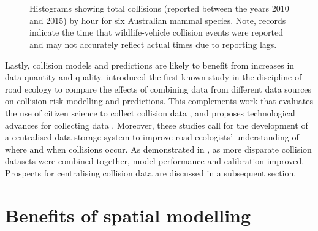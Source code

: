 \begin{figure*}[!t]
  \centering
	\begin{minipage}[t]{.9\textwidth}
    	\centering
    	\hspace{.5cm}
    	\\ 
    	\hspace{.5cm}
    	\\
    	\hspace{.5cm}
    \end{minipage}
  \caption[Total collisions by hour for six mammal species]{Histograms showing total collisions (reported between the years 2010 and 2015) by hour for six Australian mammal species. Note, records indicate the time that wildlife-vehicle collision events were reported and may not accurately reflect actual times due to reporting lags.}
  \label{temporal_all}
\end{figure*}

Lastly, collision models and predictions are likely to benefit from increases in data quantity and quality.  introduced the first known study in the discipline of road ecology to compare the effects of combining data from different data sources on collision risk modelling and predictions. This complements work that evaluates the use of citizen science to collect collision data \citep{paul14, dwye16}, and proposes technological advances for collecting data \citep{olso14}. Moreover, these studies call for the development of a centralised data storage system to improve road ecologists' understanding of where and when collisions occur. As demonstrated in , as more disparate collision datasets were combined together, model performance and calibration improved. Prospects for centralising collision data are discussed in a subsequent section. 

\section{Benefits of spatial modelling}

